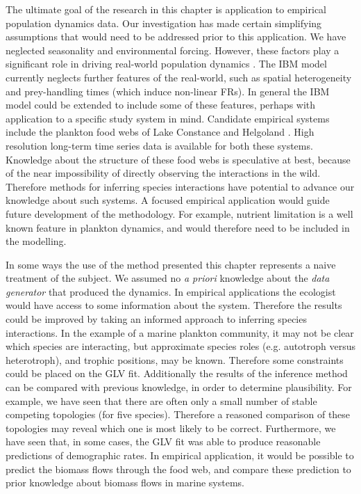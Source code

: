 The ultimate goal of the research in this chapter is application to empirical population dynamics data. Our investigation has made certain simplifying assumptions that would need to be addressed prior to this application. We have neglected seasonality and environmental forcing. However, these factors play a significant role in driving real-world population dynamics \cite{mutshinda2009drives}. The IBM model currently neglects further features of the real-world, such as spatial heterogeneity and prey-handling times (which induce non-linear FRs). In general the IBM model could be extended to include some of these features, perhaps with application to a specific study system in mind. Candidate empirical systems include the plankton food webs of Lake Constance \cite{} and Helgoland \cite{}. High resolution long-term time series data is available for both these systems. Knowledge about the structure of these food webs is speculative at best, because of the near impossibility of directly observing the interactions in the wild. Therefore methods for inferring species interactions have potential to advance our knowledge about such systems. A focused empirical application would guide future development of the methodology. For example, nutrient limitation is a well known feature in plankton dynamics, and would therefore need to be included in the modelling.


In some ways the use of the method presented this chapter represents a naive treatment of the subject. We assumed no \emph{a priori} knowledge about the \emph{data generator} that produced the dynamics. In empirical applications the ecologist would have access to some information about the system. Therefore the results could be improved by taking an informed approach to inferring species interactions. In the example of a marine plankton community, it may  not be clear which species are interacting, but approximate species roles (e.g. autotroph versus heterotroph), and trophic positions, may be known. Therefore some constraints could be placed on the GLV fit. Additionally the results of the inference method can be compared with previous knowledge, in order to determine plausibility. For example, we have seen that there are often only a small number of stable competing topologies (for five species). Therefore a reasoned comparison of these topologies may reveal which one is most likely to be correct. Furthermore, we have seen that, in some cases, the GLV fit was able to produce reasonable predictions of demographic rates. In empirical application, it would be possible to predict the biomass flows through the food web, and compare these prediction to prior knowledge about biomass flows in marine systems.

